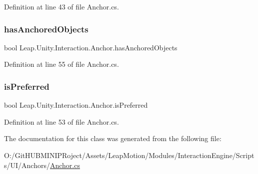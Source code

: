 Definition at line 43 of file Anchor.\+cs.

\mbox{\label{class_leap_1_1_unity_1_1_interaction_1_1_anchor_a0eead1f76beaa595b1cc2655d38e56bb}} 
\subsubsection{\texorpdfstring{hasAnchoredObjects}{hasAnchoredObjects}}
{\footnotesize\ttfamily bool Leap.\+Unity.\+Interaction.\+Anchor.\+has\+Anchored\+Objects\hspace{0.3cm}{\ttfamily [get]}}



Definition at line 55 of file Anchor.\+cs.

\mbox{\label{class_leap_1_1_unity_1_1_interaction_1_1_anchor_a86227a39919928835b07fa93eda32551}} 
\subsubsection{\texorpdfstring{isPreferred}{isPreferred}}
{\footnotesize\ttfamily bool Leap.\+Unity.\+Interaction.\+Anchor.\+is\+Preferred\hspace{0.3cm}{\ttfamily [get]}}



Definition at line 53 of file Anchor.\+cs.



The documentation for this class was generated from the following file\+:\begin{DoxyCompactItemize}
\item 
O\+:/\+Git\+H\+U\+B\+M\+I\+N\+I\+P\+Roject/\+Assets/\+Leap\+Motion/\+Modules/\+Interaction\+Engine/\+Scripts/\+U\+I/\+Anchors/\mbox{\hyperlink{_anchor_8cs}{Anchor.\+cs}}\end{DoxyCompactItemize}
